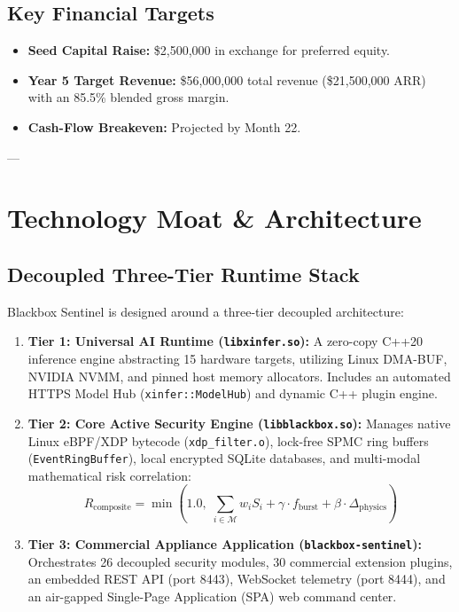 \documentclass[11pt,a4paper]{article}
\begin{document}
\subsection{Key Financial Targets}
\begin{itemize}
    \item \textbf{Seed Capital Raise:} \$2,500,000 in exchange for preferred equity.
    \item \textbf{Year 5 Target Revenue:} \$56,000,000 total revenue (\$21,500,000 ARR) with an 85.5\% blended gross margin.
    \item \textbf{Cash-Flow Breakeven:} Projected by Month 22.
\end{itemize}

---

\section{Technology Moat \& Architecture}

\subsection{Decoupled Three-Tier Runtime Stack}
Blackbox Sentinel is designed around a three-tier decoupled architecture:
\begin{enumerate}
    \item \textbf{Tier 1: Universal AI Runtime (\texttt{libxinfer.so}):} A zero-copy C++20 inference engine abstracting 15 hardware targets, utilizing Linux DMA-BUF, NVIDIA NVMM, and pinned host memory allocators. Includes an automated HTTPS Model Hub (\texttt{xinfer::ModelHub}) and dynamic C++ plugin engine.
    \item \textbf{Tier 2: Core Active Security Engine (\texttt{libblackbox.so}):} Manages native Linux eBPF/XDP bytecode (\texttt{xdp\_filter.o}), lock-free SPMC ring buffers (\texttt{EventRingBuffer}), local encrypted SQLite databases, and multi-modal mathematical risk correlation:
    \begin{equation}
    R_{\text{composite}} = \min\left(1.0, \; \sum_{i \in \mathcal{M}} w_i S_i + \gamma \cdot f_{\text{burst}} + \beta \cdot \Delta_{\text{physics}}\right)
    \end{equation}
    \item \textbf{Tier 3: Commercial Appliance Application (\texttt{blackbox-sentinel}):} Orchestrates 26 decoupled security modules, 30 commercial extension plugins, an embedded REST API (port 8443), WebSocket telemetry (port 8444), and an air-gapped Single-Page Application (SPA) web command center.
\end{enumerate}
\end{document}
